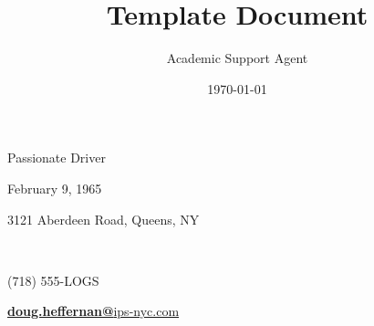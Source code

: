 \documentclass{article}
\title{Template Document}
\author{Academic Support Agent}
\date{\today}
\begin{document}
\maketitle

      {Passionate Driver}
      
\vspace{0.3cm}   
\color{lightgray}\noindent\makebox[\textwidth]{\rule{\paperwidth-0.4cm}{2.5pt}}


\begin{info}
    \begin{flushleft}
    {{\small February 9, 1965}\hfill{\LARGE \textborn\thinspace\thinspace\verythinspace}\\
    
    \vspace{0.11cm}
    
    \small 3121 Aberdeen Road, Queens, NY}\hfill{\Large\faMapMarker\thinspace\thinspace\thinspace}\\
    
    \vspace{0.08cm}
    
    {\small (718) 555-LOGS}\hfill{\LARGE\Mobilefone\thinspace}\\

    \vspace{0.14cm}
    
    \href{mailto:doug.heffernan@international-parcel-service.com}{{\small\textbf{doug.heffernan@}ips-nyc.com}\hfill{\Large\Letter}\hspace{0.6mm}{\small \faMousePointer}}\\
    
    \end{flushleft}
\end{info}
\end{document}
